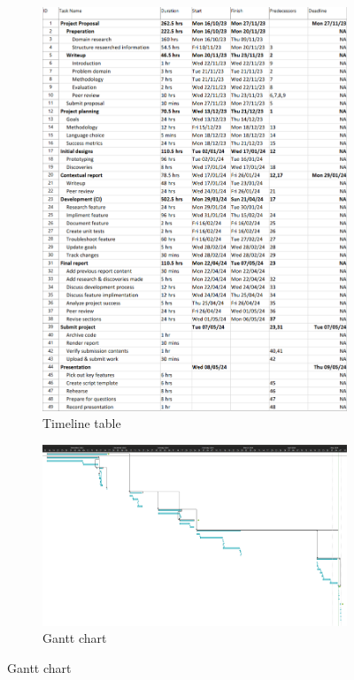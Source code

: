 \begin{figure}
    \centering
    \caption{Project Timeline}
    \label{fig:ProjectTimeline}
    \begin{subfigure}[t]{0.5\textwidth}
        \caption{Timeline table}
        \label{fig:ProjectTimelineChart}
        \includegraphics[clip, width=0.5\textheight]{../TimelineChart.png}
    \end{subfigure}
    \begin{subfigure}[b]{0.5\textwidth}
        \caption{Gantt chart}
        \label{fig:GanttChart}
        \includegraphics[clip, width=0.5\textheight]{Figures/GanttChart.png}
    \end{subfigure}
\end{figure}
